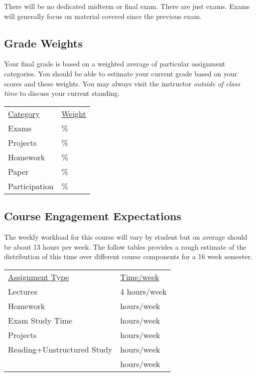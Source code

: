 \documentclass[10pt]{article}
\begin{document}
There will be no dedicated midterm or final exam. There are just exams.  Exams will generally focus on material covered since the previous exam.

\subsection{Grade Weights}

Your final grade is based on a weighted average of particular assignment categories.  You should be able to estimate your current grade based on your scores and these weights.  You may always visit the instructor \textit{outside of class time} to discuss your current standing.

\begin{center}
  \begin{tabular}{ll}
  \underline{Category} & \underline{Weight} \\
    Exams & \% \\
    Projects & \% \\
    Homework & \% \\
    Paper & \% \\
    Participation & \%
  \end{tabular}
\end{center}


\subsection{Course Engagement Expectations}

The weekly workload for this course will vary by student but on average should be about 13 hours per week.  The follow tables provides a rough estimate of the distribution of this time over different course components for a 16 week semester.
\begin{center}
\begin{tabular}{ll}
\underline{Assignment Type} & \underline{Time/week} \\
Lectures       & 4 hours/week \\
Homework          &  hours/week \\
Exam Study Time    &  hours/week \\
Projects          &  hours/week \\
Reading+Unstructured Study &   hours/week \\
\bottomrule
 &  hours/week
\end{tabular}
\end{center}
\end{document}
